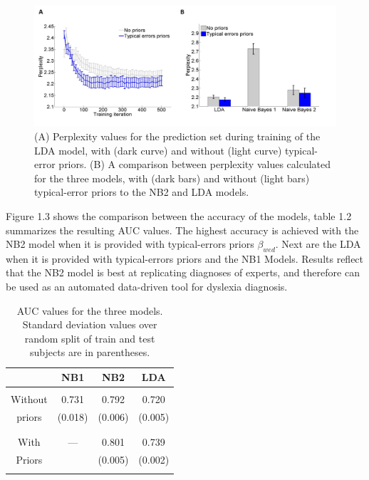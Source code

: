 {{\begin{figure}
\vspace{.3in}
\includegraphics[width=\textwidth]{Figures/Ch1/figure5AB_HOZ}
\caption{(A) Perplexity values for the prediction set during training of the LDA model, with (dark curve) and without (light curve) typical-error priors. (B) A comparison between perplexity values calculated for the three models, with (dark bars) and without (light bars) typical-error priors to the NB2 and LDA models.}
\vspace{.3in}
\end{figure}

 \vspace*{2\baselineskip}

Figure 1.3 shows the comparison between the accuracy of the models, table 1.2 summarizes the resulting AUC values. The highest accuracy is achieved with the NB2 model when it is provided with typical-errors priors $\beta_{wed}$. Next are the LDA when it is provided with typical-errors priors and the NB1 Models. Results reflect that the NB2 model is best at replicating diagnoses of experts, and therefore can be used as an automated data-driven tool for dyslexia diagnosis.

\begin{table}
\centering
\begin{tabular}{|c|c|c|c|} \hline
& NB1 & NB2 & LDA \\
\hline
&&&\\
Without & 0.731 & 0.792 & 0.720 \\
priors & (0.018) & (0.006) & (0.005) \\
&&&\\
\hline
&&&\\
With & --- & 0.801 & 0.739 \\
Priors &  & (0.005) & (0.002) \\
&&&\\
\hline\end{tabular}
\bigskip
\caption{AUC values for the three models. Standard deviation values over random split of train and test subjects are in parentheses.} 
\end{table}

}}
